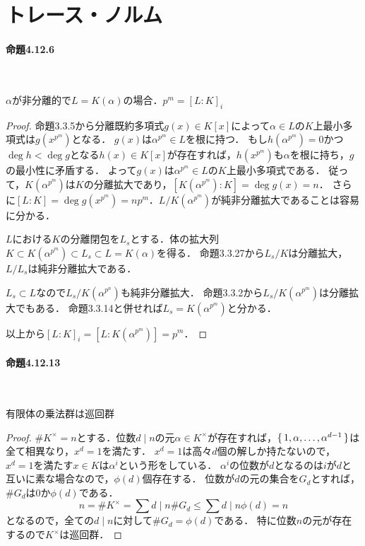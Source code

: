 \documentclass[a4paper]{ltjsreport}
\begin{document}
\section{トレース・ノルム}
\paragraph{命題4.12.6}~
\begin{screen}
  \(\alpha\)が非分離的で\(L=K(\alpha)\)の場合．\(p^m = [L:K]_i\)
\end{screen}
\begin{proof}
  命題3.3.5から分離既約多項式\(g(x)\in K[x]\)によって\(\alpha\in L\)の\(K\)上最小多項式は\(g(x^{p^m})\)となる．
  \(g(x)\)は\(\alpha^{p^m} \in L\)を根に持つ．
  もし\(h(\alpha^{p^m}) = 0\)かつ\(\deg h < \deg g\)となる\(h(x) \in K[x]\)が存在すれば，\(h(x^{p^m})\)も\(\alpha\)を根に持ち，\(g\)の最小性に矛盾する．
  よって\(g(x)\)は\(\alpha^{p^m} \in L\)の\(K\)上最小多項式である．
  従って，\(K(\alpha^{p^m})\)は\(K\)の分離拡大であり，\([K(\alpha^{p^m}):K]=\deg g(x) = n\)．
  さらに\([L:K]=\deg g(x^{p^m})=np^m\)．\(L/K(\alpha^{p^m})\)が純非分離拡大であることは容易に分かる．

  \(L\)における\(K\)の分離閉包を\(L_s\)とする．体の拡大列\(K \subset K(\alpha^{p^m}) \subset L_s \subset L=K(\alpha)\)を得る．
  命題3.3.27から\(L_s/K\)は分離拡大，\(L/L_s\)は純非分離拡大である．

  \(L_s\subset L\)なので\(L_s/K(\alpha^{p^n})\)も純非分離拡大．
  命題3.3.2から\(L_s/K(\alpha^{p^m})\)は分離拡大でもある．
  命題3.3.14と併せれば\(L_s = K(\alpha^{p^m})\)と分かる．

  以上から\([L:K]_i = [L:K(\alpha^{p^m})] = p^m\)．
\end{proof}

\paragraph{命題4.12.13}~
\begin{screen}
  有限体の乗法群は巡回群
\end{screen}
\begin{proof}
  \(\# K^\times = n\)とする．位数\(d\mid n\)の元\(\alpha\in K^\times\)が存在すれば，\(\set{1, \alpha, \ldots, \alpha^{d-1}}\)は全て相異なり，\(x^d=1\)を満たす．
  \(x^d=1\)は高々\(d\)個の解しか持たないので，
  \(x^d=1\)を満たす\(x\in K\)は\(\alpha^i\)という形をしている．
  \(\alpha^i\)の位数が\(d\)となるのは\(i\)が\(d\)と互いに素な場合なので，\(\phi(d)\)個存在する．
  位数が\(d\)の元の集合を\(G_d\)とすれば，\(\# G_d\)は\(0\)か\(\phi(d)\)である．
  \[ n = \# K^\times = \sum{d\mid n} \# G_d \leq \sum{d\mid n} \phi(d) = n  \]
  となるので，全ての\(d\mid n\)に対して\(\# G_d = \phi(d)\)である．
  特に位数\(n\)の元が存在するので\(K^\times\)は巡回群．
\end{proof}
\end{document}
